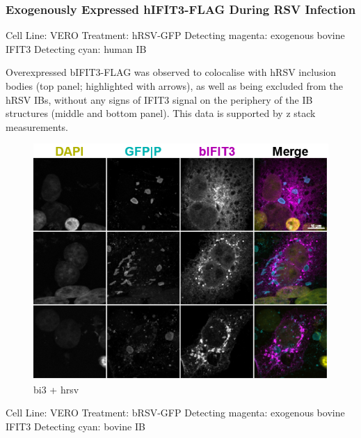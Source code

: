 \subsubsection{Exogenously Expressed hIFIT3-FLAG During RSV Infection} \label{Exogenously Expressed hIFIT3-FLAG During RSV Infection}
Cell Line: VERO \newline
Treatment: hRSV-GFP \newline
Detecting magenta: exogenous bovine IFIT3 \newline
Detecting cyan: human IB \newline

Overexpressed bIFIT3-FLAG was observed to colocalise with hRSV inclusion bodies (top panel; highlighted with arrows), as well as being excluded from the hRSV IBs, without any signs of IFIT3 signal on the periphery of the IB structures (middle and bottom panel). This data is supported by z stack measurements.

\begin{figure}
    \centering
    \includegraphics[width=1\linewidth]{09. Chapter 4/Figs/04. IFIT3/05. bi3 hrsv.png}
    \caption[bi3 + hrsv]{bi3 + hrsv}
    \label{fig:bi3 + hrsv}
\end{figure}

Cell Line: VERO \newline
Treatment: bRSV-GFP \newline
Detecting magenta: exogenous bovine IFIT3 \newline
Detecting cyan: bovine IB \newline

